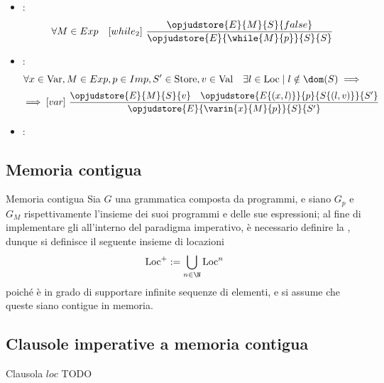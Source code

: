 \documentclass[a4paper, 12pt]{report}
\begin{document}
\begin{example}
\begin{itemize}
            \item {}:  $$\forall M \in Exp \quad [while_2] \ \dfrac{\opjudstore{E}{M}{S}{false}}{\opjudstore{E}{\while{M}{p}}{S}{S}}$$
            \item {}: $$\forall x \in \mathrm{Var}, M \in Exp, p \in Imp, S' \in \mathrm{Store}, v \in \mathrm{Val} \quad \exists l \in \mathrm{Loc} \mid l \notin \dom(S) \implies$$ $$\implies [var] \ \dfrac{\opjudstore{E}{M}{S}{v} \quad \opjudstore{E\{(x,l)\}}{p}{S\{(l,v)\}}{S'}}{\opjudstore{E}{\varin{x}{M}{p}}{S}{S'}}$$
            \item {}: 
        \end{itemize}
    \end{example}

    \subsection{Memoria contigua}

    \begin{frameddefn}{Memoria contigua}
        Sia $G$ una grammatica composta da programmi, e siano $G_p$ e $G_M$ rispettivamente l'insieme dei suoi programmi e delle sue espressioni; al fine di implementare gli  all'interno del paradigma imperativo, è necessario definire la , dunque si definisce il seguente insieme di locazioni $$\displaystyle \mathrm{Loc}^+ := \bigcup_{n \in \N}{\mathrm{Loc}^n}$$ poiché è in grado di supportare infinite sequenze di elementi, e si assume che queste siano contigue in memoria.
    \end{frameddefn}

    \subsection{Clausole imperative a memoria contigua}

    \begin{frameddefn}{Clausola $loc$}
        TODO
    \end{frameddefn}
\end{document}
